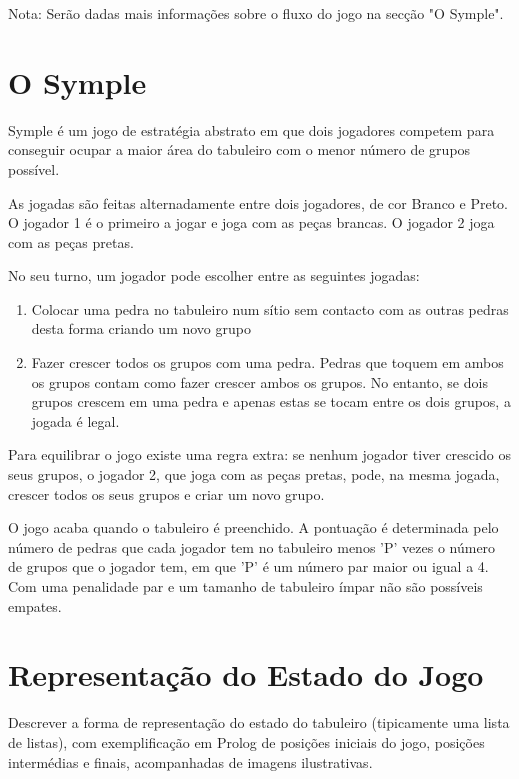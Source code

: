 \documentclass[a4paper]{article}
\begin{document}
Nota: Serão dadas mais informações sobre o fluxo do jogo na secção "O Symple".


\section{O Symple}
Symple é um jogo de estratégia abstrato em que dois jogadores competem para conseguir ocupar a maior área do tabuleiro com o menor número de grupos possível.

As jogadas são feitas alternadamente entre dois jogadores, de cor Branco e Preto. O jogador 1 é o primeiro a jogar e joga com as peças brancas. O jogador 2 joga com as peças pretas.

No seu turno, um jogador pode escolher entre as seguintes jogadas:
\begin{enumerate}
\item Colocar uma pedra no tabuleiro num sítio sem contacto com as outras pedras desta forma criando um novo grupo
\item Fazer crescer todos os grupos com uma pedra. Pedras que toquem em ambos os grupos contam como fazer crescer ambos os grupos. No entanto, se dois grupos crescem em uma pedra e apenas estas se tocam entre os dois grupos, a jogada é legal.
\end{enumerate}

Para equilibrar o jogo existe uma regra extra: se nenhum jogador tiver crescido os seus grupos, o jogador 2, que joga com as peças pretas, pode, na mesma jogada, crescer todos os seus grupos e criar um novo grupo.

O jogo acaba quando o tabuleiro é preenchido. A pontuação é determinada pelo número de pedras que cada jogador tem no tabuleiro menos 'P' vezes o número de grupos que o jogador tem, em que 'P' é um número par maior ou igual a 4. Com uma penalidade par e um tamanho de tabuleiro ímpar não são possíveis empates.

\section{Representação do Estado do Jogo}
Descrever a forma de representação do estado do tabuleiro (tipicamente uma lista de listas), com exemplificação em Prolog de posições iniciais do jogo, posições intermédias e finais, acompanhadas de imagens ilustrativas.
\end{document}
